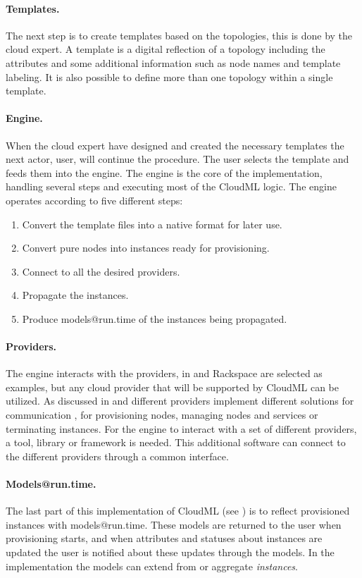 \paragraph{Templates.}

The next step is to create templates based on the topologies, this is done by
the cloud expert.
A template is a digital reflection of a topology including the attributes and some additional 
information such as node names and template labeling.
It is also possible to define more than one topology within a single template.

\paragraph{Engine.}

When the cloud expert have designed and created the necessary templates the next actor, 
user, will continue the procedure.
The user selects the template and feeds them into the engine.
The engine is the core of the implementation, handling several steps and executing
most of the CloudML logic.
The engine operates according to five different steps:
\begin{enumerate}
  \item Convert the template files into a native format for later use.
  \item Convert pure nodes into instances ready for provisioning.
  \item Connect to all the desired providers.
  \item Propagate the instances.
  \item Produce models@run.time of the instances being propagated.
\end{enumerate}

\paragraph{Providers.}

The engine interacts with the providers, in  
 and Rackspace are selected as examples, but any
cloud provider that will be supported by CloudML can be utilized.
As discussed in  and 
different providers implement different solutions for communication
\eg, for provisioning nodes, managing nodes and services or terminating instances.
For the engine to interact with a set of different providers, 
a tool, library or framework is needed.
This additional software can connect to the different providers through a common interface.

\paragraph{Models@run.time.}

The last part of this implementation of CloudML (see ) is to
reflect provisioned instances with models@run.time.
These models are returned to the user when provisioning starts, 
and when attributes and statuses about instances are updated the user is 
notified about these updates through the models.
In the implementation the models can extend from or aggregate \emph{instances}.
